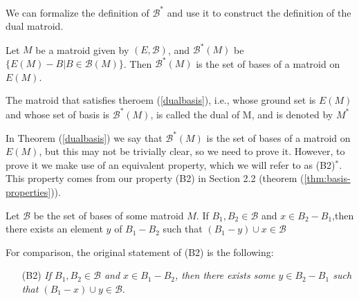 

We can formalize the definition of $\mathcal{B}^*$ and use it to construct the definition of the dual matroid.

\begin{theorem}\label{dualbasis}
    Let $M$ be a matroid given by $(E,\mathcal{B})$, and $\mathcal{B}^*(M)$ be $\{E(M) - B|B\in \mathcal{B}(M)\}$. Then $\mathcal{B}^*(M)$ is the set of bases of a matroid on $E(M)$.
\end{theorem}

\begin{defn}
     The matroid that satisfies theroem (\ref{dualbasis}), i.e., whose ground set is $E(M)$ and whose set of basis is $\mathcal{B}^*(M)$, is called the dual of M, and is denoted by $M^*$
\end{defn}

In Theorem (\ref{dualbasis}) we say that $\mathcal{B}^*(M)$ is the set of bases of a matroid on $E(M)$, but this may not be trivially clear, so we need to prove it. However, to prove it we make use of an equivalent property, which we will refer to as (B2)$^*$. This property comes from our property (B2) in Section 2.2 (theorem (\ref{thm:basis-properties})).

\begin{lemma}[(B2)$^*$]\label{B2Dual}
    Let $\mathcal{B}$ be the set of bases of some matroid $M$. If $B_1, B_2 \in \mathcal{B}$ and $x \in B_2 - B_1$,then there exists an element $y$ of $B_1 - B_2$ such that $(B_1 - y) \cup x \in \mathcal{B}$
\end{lemma}

For comparison, the original statement of (B2) is the following:
\begin{enumerate}
    \item[(B2)] \textit{If $B_1,B_2\in \mathcal{B}$ and $x\in B_1 - B_2$, then there exists some $y\in B_2 - B_1$ such that $(B_1 - x)\cup y \in \mathcal{B}$}.
\end{enumerate}

